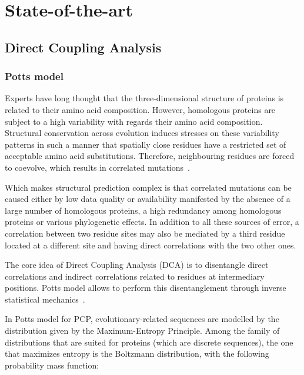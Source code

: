 \chapter{State-of-the-art}

\section{Direct Coupling Analysis}

    \subsection{Potts model} \label{potts}

        Experts have long thought that the three-dimensional structure of proteins
        is related to their amino acid composition. However, homologous proteins
        are subject to a high variability with regards their amino acid composition.
        Structural conservation across evolution induces stresses on these variability
        patterns in such a manner that spatially close residues have a restricted set
        of acceptable amino acid substitutions. Therefore, neighbouring residues
        are forced to coevolve, which results in correlated mutations~\cite{Morcos2014}.

        Which makes structural prediction complex is that correlated mutations can
        be caused either by low data quality or availability manifested by the absence
        of a large number of homologous proteins, a high redundancy among homologous
        proteins or various phylogenetic effects. In addition to all these sources
        of error, a correlation between two residue sites may also be mediated by a third
        residue located at a different site and having direct correlations with the two
        other ones.

        The core idea of Direct Coupling Analysis (DCA) is to disentangle direct
        correlations and indirect correlations related to residues at intermediary positions.
        Potts model allows to perform this disentanglement through inverse
        statistical mechanics~\cite{PhysRevE.87.012707}.

        In Potts model for PCP, evolutionary-related sequences are modelled by the distribution
        given by the Maximum-Entropy Principle. Among the family of distributions that are suited
        for proteins (which are discrete sequences), the one that maximizes entropy is the
        Boltzmann distribution, with the following probability mass function:

